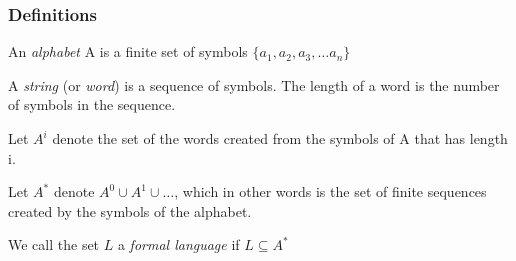 \documentclass{beamer}
\newcommand{\alphabetSymbol}{A}
\newcommand{\alphabet}{\alphabetSymbol}
\newcommand{\alphabetpow}[1]{\alphabetSymbol^{#1}}
\newcommand{\languagesymbol}{L}
\begin{document}
\begin{frame}
	\frametitle{Definitions}
	\begin{definition}[Alphabet]
		An \emph{alphabet} \alphabet{} is a finite set of symbols $\{a_1, a_2, a_3, \ldots a_n\}$
	\end{definition}
	
	 {
	\begin{definition}[Words]
		A \emph{string} (or \emph{word}) is a sequence of symbols. The length of a word is the number of symbols in the sequence.
	\end{definition}
	}
	
	 {
		\begin{definition}
		Let $\alphabetpow{i}$ denote the set of the words created from the symbols of \alphabet{} that has length i. 
		
		Let $\alphabetpow{*}$ denote $\alphabetSymbol^0 \cup \alphabetSymbol^1 \cup \ldots$, which in other words is the set of finite sequences created by the symbols of the alphabet.
	
		We call the set $ \languagesymbol{}$ a \emph{formal language} if $\languagesymbol{} \subseteq \alphabetpow{*}$
	\end{definition}
	}
	
\end{frame}
\end{document}
